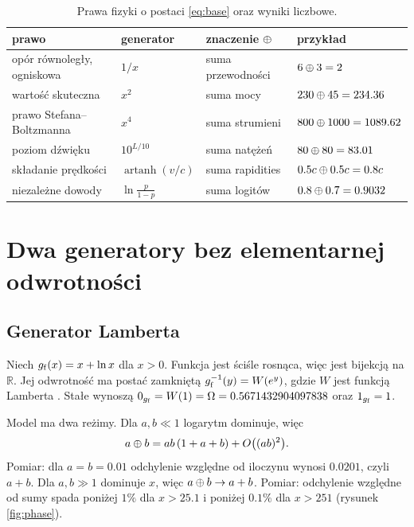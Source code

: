 \documentclass[11pt,a4paper]{article}
\begin{document}
\begin{table}[t]
\centering
\small
\caption{Prawa fizyki o postaci \eqref{eq:base} oraz wyniki liczbowe.}
\label{tab:laws}
\begin{tabularx}{\textwidth}{@{}l l l X@{}}
\toprule
\textbf{prawo} & \textbf{generator} & \textbf{znaczenie $\mathbin{\oplus}$} & \textbf{przykład} \\
\midrule
opór równoległy, ogniskowa & $1/x$ & suma przewodności & $6\mathbin{\oplus}3=2$ \\
wartość skuteczna & $x^{2}$ & suma mocy & $230\mathbin{\oplus}45=234.36$ \\
prawo Stefana--Boltzmanna & $x^{4}$ & suma strumieni & $800\mathbin{\oplus}1000=1089.62$ \\
poziom dźwięku & $10^{L/10}$ & suma natężeń & $80\mathbin{\oplus}80=83.01$ \\
składanie prędkości & $\operatorname{artanh}(v/c)$ & suma rapidities & $0.5c\mathbin{\oplus}0.5c=0.8c$ \\
niezależne dowody & $\ln\frac{p}{1-p}$ & suma logitów & $0.8\mathbin{\oplus}0.7=0.9032$ \\
\bottomrule
\end{tabularx}
\end{table}

\section{Dwa generatory bez elementarnej odwrotności}

\subsection{Generator Lamberta}

Niech $g_{\mathrm{f}}(x)=x+\ln x$ dla $x>0$. Funkcja jest ściśle rosnąca, więc jest
bijekcją na $\mathbb{R}$. Jej odwrotność ma postać zamkniętą
$g_{\mathrm{f}}^{-1}(y)=W(e^{y})$, gdzie $W$ jest funkcją Lamberta \cite{corless1996}.
Stałe wynoszą $0_{g_{\mathrm{f}}}=W(1)=\Omega=0.5671432904097838$ oraz $1_{g_{\mathrm{f}}}=1$.

Model ma dwa reżimy. Dla $a,b\ll1$ logarytm dominuje, więc
\[
a\mathbin{\oplus} b=ab\,(1+a+b)+O\big((ab)^{2}\big).
\]
Pomiar: dla $a=b=0.01$ odchylenie względne od iloczynu wynosi $0.0201$, czyli
$a+b$. Dla $a,b\gg1$ dominuje $x$, więc $a\mathbin{\oplus} b\to a+b$. Pomiar: odchylenie
względne od sumy spada poniżej $1\%$ dla $x>25.1$ i poniżej $0.1\%$ dla
$x>251$ (rysunek \ref{fig:phase}).
\end{document}
